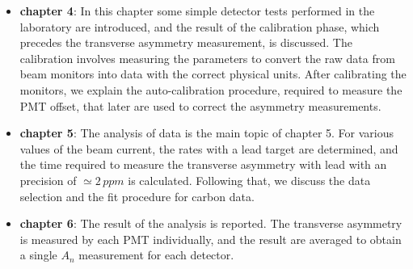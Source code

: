 \begin{itemize}
\item \textbf{chapter 4}: In this chapter some simple detector tests performed in the laboratory are introduced, and the result of the calibration phase, which precedes the transverse asymmetry measurement, is discussed. The calibration involves measuring the parameters to convert the raw data from beam monitors into data with the correct physical units. After calibrating the monitors, we explain the auto-calibration procedure, required to measure the PMT offset, that later are used to correct the asymmetry measurements.
\item \textbf{chapter 5}: The analysis of data is the main topic of chapter 5. For various values of the beam current, the rates with a lead target are determined, and the time required to measure the transverse asymmetry with lead with an precision of $\simeq 2 \, ppm$ is calculated. Following that, we discuss the data selection and the fit procedure for carbon data.
\item \textbf{chapter 6}: The result of the analysis is reported. The transverse asymmetry is measured by each PMT individually, and the result are averaged to obtain a single $A_{n}$ measurement for each detector.  
\end{itemize}
